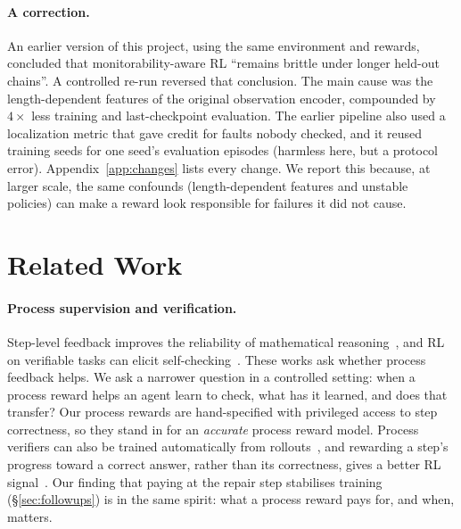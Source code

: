 \paragraph{A correction.}
An earlier version of this project, using the same environment and rewards, concluded that monitorability-aware RL ``remains brittle under longer held-out chains''. A controlled re-run reversed that conclusion. The main cause was the length-dependent features of the original observation encoder, compounded by $4{\times}$ less training and last-checkpoint evaluation. The earlier pipeline also used a localization metric that gave credit for faults nobody checked, and it reused training seeds for one seed's evaluation episodes (harmless here, but a protocol error). Appendix~\ref{app:changes} lists every change. We report this because, at larger scale, the same confounds (length-dependent features and unstable policies) can make a reward look responsible for failures it did not cause.

\section{Related Work}
\label{sec:related}

\paragraph{Process supervision and verification.}
Step-level feedback improves the reliability of mathematical reasoning~\citep{uesato2022process,lightman2024verify}, and RL on verifiable tasks can elicit self-checking~\citep{deepseek2025r1,xie2025logicrl}. These works ask whether process feedback helps. We ask a narrower question in a controlled setting: when a process reward helps an agent learn to check, what has it learned, and does that transfer? Our process rewards are hand-specified with privileged access to step correctness, so they stand in for an \emph{accurate} process reward model. Process verifiers can also be trained automatically from rollouts~\citep{wang2024mathshepherd}, and rewarding a step's progress toward a correct answer, rather than its correctness, gives a better RL signal~\citep{setlur2025rewarding}. Our finding that paying at the repair step stabilises training (\S\ref{sec:followups}) is in the same spirit: what a process reward pays for, and when, matters.

